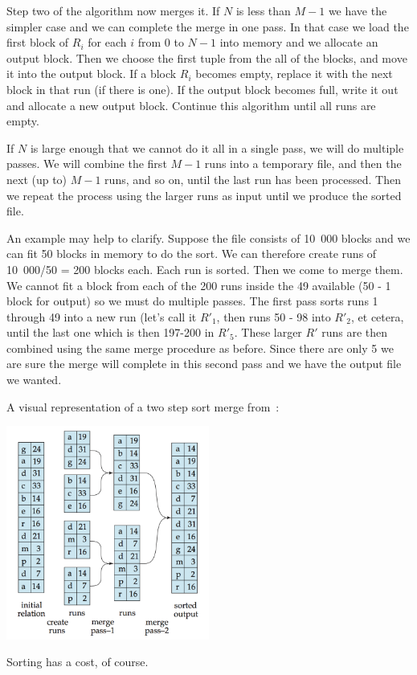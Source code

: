 Step two of the algorithm now merges it. If $N$ is less than $M-1$ we have the simpler case and we can complete the merge in one pass. In that case we load the first block of $R_{i}$ for each $i$ from $0$ to $N-1$ into memory and we allocate an output block. Then we choose the first tuple from the all of the blocks, and move it into the output block. If a block $R_{i}$ becomes empty, replace it with the next block in that run (if there is one). If the output block becomes full, write it out and allocate a new output block. Continue this algorithm until all runs are empty. 

If $N$ is large enough that we cannot do it all in a single pass, we will do multiple passes. We will combine the first $M-1$ runs into a temporary file, and then the next (up to) $M-1$ runs, and so on, until the last run has been processed. Then we repeat the process using the larger runs as input until we produce the sorted file.

An example may help to clarify. Suppose the file consists of 10~000 blocks and we can fit 50 blocks in memory to do the sort. We can therefore create runs of 10~000/50 = 200 blocks each. Each run is sorted. Then we come to merge them. We cannot fit a block from each of the 200 runs inside the 49 available (50 - 1 block for output) so we must do multiple passes. The first pass sorts runs 1 through 49 into a new run (let's call it $R'_{1}$, then runs 50 - 98 into $R'_{2}$, et cetera, until the last one which is then 197-200 in $R'_{5}$. These larger $R'$ runs are then combined using the same merge procedure as before. Since there are only 5 we are sure the merge will complete in this second pass and we have the output file we wanted.

A visual representation of a two step sort merge from~\cite{dsc}:

\begin{center}
	\includegraphics[width=0.5\textwidth]{images/external-merge}
\end{center}

Sorting has a cost, of course. 




